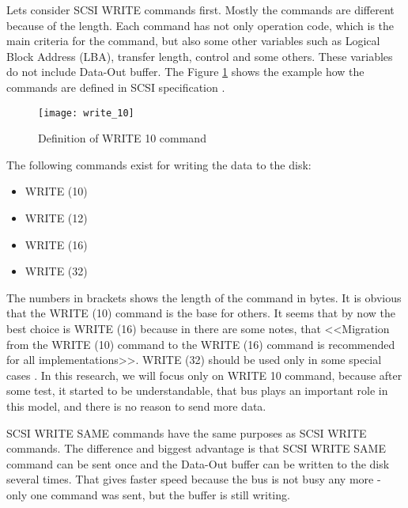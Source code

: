 Lets consider SCSI WRITE commands first. Mostly the commands are different because of the length. Each command has not only operation code, which is the main criteria for the command, but also some other variables such as Logical Block Address (LBA), transfer length, control and some others. These variables do not include Data-Out buffer. The Figure \ref{fig:write_10} shows the example how the commands are defined in SCSI specification \cite{scsi3_bc}.
\begin{figure}[h]
\begin{center}
  \texttt{[image: write\_10]}
\end{center}
  \caption{Definition of WRITE 10 command}
  \label{fig:write_10}
\end{figure}

The following commands exist for writing the data to the disk:
\begin{itemize}%
	\setlength{\itemsep}{-2mm}
	\item WRITE (10)
	\item WRITE (12)
	\item WRITE (16)
	\item WRITE (32)
\end{itemize}
The numbers in brackets shows the length of the command in bytes. It is obvious that the WRITE (10) command is the base for others. It seems that by now the best choice is WRITE (16) because in \cite{scsi3_bc} there are some notes, that <<Migration from the WRITE (10) command to the WRITE (16) command is recommended for all implementations>>. WRITE (32) should be used only in some special cases \cite{scsi3_bc}. In this research, we will focus only on WRITE 10 command, because after some test, it started to be understandable, that bus plays an important role in this model, and there is no reason to send more data.

SCSI WRITE SAME commands have the same purposes as SCSI WRITE commands. The difference and biggest advantage is that SCSI WRITE SAME command can be sent once and the Data-Out buffer can be written to the disk several times. That gives faster speed because the bus is not busy any more - only one command was sent, but the buffer is still writing. 

